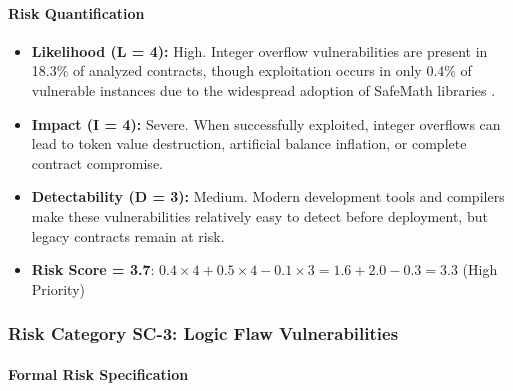 \paragraph{Risk Quantification}

\begin{itemize}
\item \textbf{Likelihood (L = 4):} High. Integer overflow vulnerabilities are present in 18.3\% of analyzed contracts, though exploitation occurs in only 0.4\% of vulnerable instances due to the widespread adoption of SafeMath libraries \cite{perez2021analysis}.

\item \textbf{Impact (I = 4):} Severe. When successfully exploited, integer overflows can lead to token value destruction, artificial balance inflation, or complete contract compromise.

\item \textbf{Detectability (D = 3):} Medium. Modern development tools and compilers make these vulnerabilities relatively easy to detect before deployment, but legacy contracts remain at risk.

\item \textbf{Risk Score = 3.7}: $0.4 \times 4 + 0.5 \times 4 - 0.1 \times 3 = 1.6 + 2.0 - 0.3 = 3.3$ (High Priority)
\end{itemize}

\subsubsection{Risk Category SC-3: Logic Flaw Vulnerabilities}

\paragraph{Formal Risk Specification}

